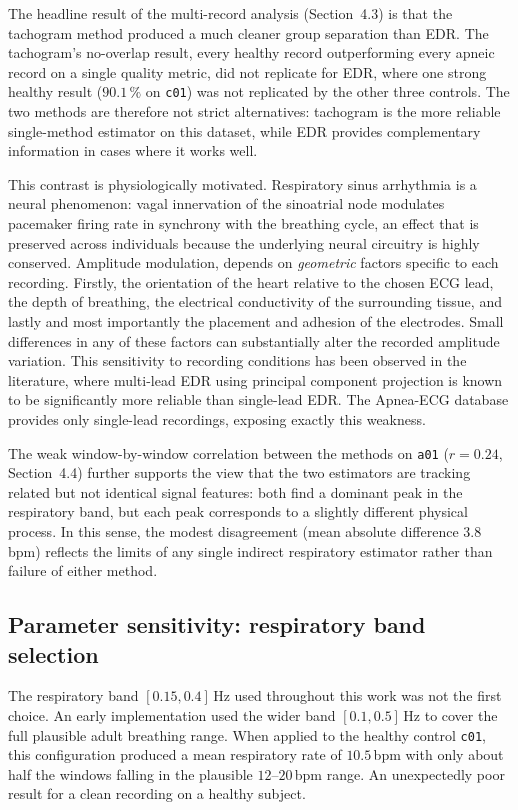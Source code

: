 \documentclass[11pt,a4paper]{article}
\begin{document}
The headline result of the multi-record analysis (Section~4.3) is that the tachogram method produced a much cleaner group separation than EDR. The tachogram's no-overlap result, every healthy record outperforming every apneic record on a single quality metric, did not replicate for EDR, where one strong healthy result ($90.1\,\%$ on \texttt{c01}) was not replicated by the other three controls. The two methods are therefore not strict alternatives: tachogram is the more reliable single-method estimator on this dataset, while EDR provides complementary information in cases where it works well.

This contrast is physiologically motivated. Respiratory sinus arrhythmia is a neural phenomenon: vagal innervation of the sinoatrial node modulates pacemaker firing rate in synchrony with the breathing cycle, an effect that is preserved across individuals because the underlying neural circuitry is highly conserved. Amplitude modulation, depends on \textit{geometric} factors specific to each recording. Firstly, the orientation of the heart relative to the chosen ECG lead, the depth of breathing, the electrical conductivity of the surrounding tissue, and lastly and most importantly the placement and adhesion of the electrodes. Small differences in any of these factors can substantially alter the recorded amplitude variation. This sensitivity to recording conditions has been observed in the literature, where multi-lead EDR using principal component projection \cite{moody1985derivation} is known to be significantly more reliable than single-lead EDR. The Apnea-ECG database provides only single-lead recordings, exposing exactly this weakness.

The weak window-by-window correlation between the methods on \texttt{a01} ($r = 0.24$, Section~4.4) further supports the view that the two estimators are tracking related but not identical signal features: both find a dominant peak in the respiratory band, but each peak corresponds to a slightly different physical process. In this sense, the modest disagreement (mean absolute difference 3.8\,bpm) reflects the limits of any single indirect respiratory estimator rather than failure of either method.

\subsection{Parameter sensitivity: respiratory band selection}

The respiratory band $[0.15, 0.4]$\,Hz used throughout this work was not the first choice. An early implementation used the wider band $[0.1, 0.5]$\,Hz to cover the full plausible adult breathing range. When applied to the healthy control \texttt{c01}, this configuration produced a mean respiratory rate of $10.5$\,bpm with only about half the windows falling in the plausible $12$--$20$\,bpm range. An unexpectedly poor result for a clean recording on a healthy subject.
\end{document}
